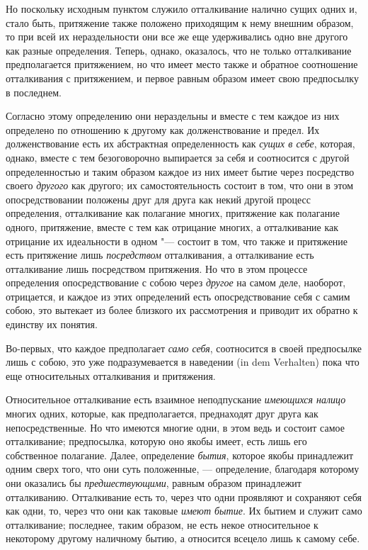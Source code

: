 Но поскольку исходным пунктом служило отталкивание налично сущих одних и,
стало быть, притяжение также положено приходящим к нему внешним образом, то
при всей их нераздельности они все же еще удерживались одно вне другого как
разные определения. Теперь, однако, оказалось, что не только отталкивание
предполагается притяжением, но что имеет место также и обратное соотношение
отталкивания с притяжением, и первое равным образом имеет свою предпосылку
в последнем.

Согласно этому определению они нераздельны и вместе с тем каждое из них
определено по отношению к другому как долженствование и предел. Их
долженствование есть их абстрактная определенность как
{\em сущих в себе}, которая, однако, вместе с тем
безоговорочно выпирается за себя и соотносится с другой определенностью и
таким образом каждое из них имеет бытие через посредство своего
{\em другого} как другого; их самостоятельность состоит
в том, что они в этом опосредствовании положены друг для друга как некий
другой процесс определения, отталкивание как полагание многих, притяжение
как полагание одного, притяжение, вместе с тем как отрицание многих, а
отталкивание как отрицание их идеальности в одном "--- состоит в том, что
также и притяжение есть притяжение лишь
{\em посредством} отталкивания, а отталкивание есть
отталкивание лишь посредством притяжения. Но что в этом процессе
определения опосредствование с собою через {\em другое}
на самом деле, наоборот, отрицается, и каждое из этих определений есть
опосредствование себя с самим собою, это вытекает из более близкого их
рассмотрения и приводит их обратно к единству их понятия.

Во-первых, что каждое предполагает {\em само себя},
соотносится в своей предпосылке лишь с собою, это уже подразумевается в
наведении (in dem Verhalten) пока что еще относительных отталкивания и
притяжения.

Относительное отталкивание есть взаимное неподпускание
{\em имеющихся налицо} многих одних, которые, как
предполагается, преднаходят друг друга как непосредственные. Но что имеются
многие одни, в этом ведь и состоит самое отталкивание; предпосылка, которую
оно якобы имеет, есть лишь его собственное полагание. Далее, определение
{\em бытия}, которое якобы принадлежит одним сверх
того, что они суть положенные, — определение, благодаря которому они
оказались бы {\em предшествующими}, равным образом
принадлежит отталкиванию. Отталкивание есть то, через что одни проявляют и
сохраняют себя как одни, то, через что они как таковые
{\em имеют бытие}. Их бытием и служит само
отталкивание; последнее, таким образом, не есть некое относительное к
некоторому другому наличному бытию, а относится всецело лишь к самому себе.

